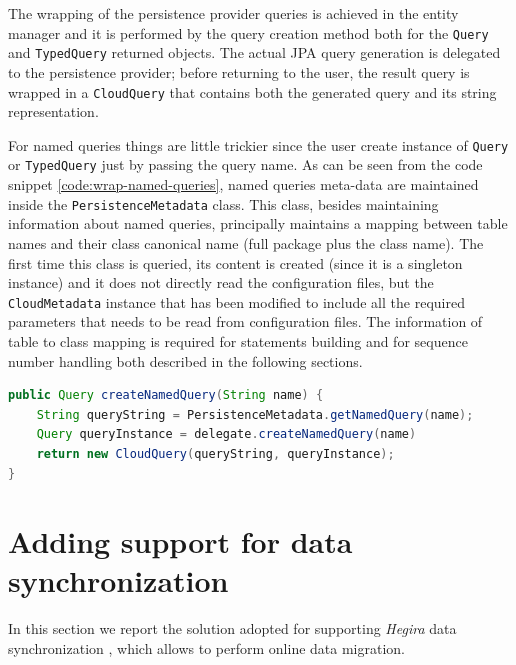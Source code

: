 \noindent The wrapping of the persistence provider queries is achieved in the entity manager and it is performed by the query creation method both for the \texttt{Query} and \texttt{TypedQuery} returned objects. The actual JPA query generation is delegated to the persistence provider; before returning to the user, the result query is wrapped in a \texttt{CloudQuery} that contains both the generated query and its string representation.

\newparagraph For named queries things are little trickier since the user create instance of \texttt{Query} or \texttt{TypedQuery} just by passing the query name.
\noindent As can be seen from the code snippet \ref{code:wrap-named-queries}, named queries meta-data are maintained inside the \texttt{PersistenceMetadata} class. This class, besides maintaining information about named queries, principally maintains a mapping between table names and their class canonical name (full package plus the class name). The first time this class is queried, its content is created (since it is a singleton instance) and it does not directly read the  configuration files, but the \texttt{CloudMetadata} instance that has been modified to include all the required parameters that needs to be read from configuration files. 
The information of table to class mapping is required for statements building and for sequence number handling both described in the following sections.

\begin{lstlisting}[language=Java, caption=Wrap named queries, label=code:wrap-named-queries]
public Query createNamedQuery(String name) {
    String queryString = PersistenceMetadata.getNamedQuery(name);
    Query queryInstance = delegate.createNamedQuery(name)
    return new CloudQuery(queryString, queryInstance);
}
\end{lstlisting}

\section{Adding support for data synchronization}
\label{sec:sync}
In this section we report the solution adopted for supporting \textit{Hegira} data synchronization \cite{paper:modaclouds-deliverable}, which allows to perform online data migration.

